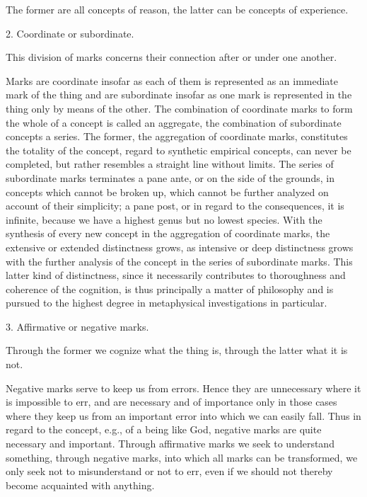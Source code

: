     The former are all concepts of reason,
    the latter can be concepts of experience.

    2. Coordinate or subordinate.

    This division of marks concerns their connection after or under one another.

    Marks are coordinate insofar as each of them is
    represented as an immediate mark of the thing
    and are subordinate insofar as one mark is
    represented in the thing only by means of the other.
    The combination of coordinate marks to form
    the whole of a concept is called an aggregate,
    the combination of subordinate concepts a series.
    The former, the aggregation of coordinate marks,
    constitutes the totality of the concept,
    regard to synthetic empirical concepts, can never be completed,
    but rather resembles a straight line without limits.
    The series of subordinate marks terminates a pane ante,
    or on the side of the grounds, in concepts which cannot be broken up,
    which cannot be further analyzed on account of their simplicity;
    a pane post, or in regard to the consequences, it is infinite,
    because we have a highest genus but no lowest species.
    With the synthesis of every new concept in the aggregation of coordinate marks,
    the extensive or extended distinctness grows,
    as intensive or deep distinctness grows with the further
    analysis of the concept in the series of subordinate marks.
    This latter kind of distinctness, since it necessarily
    contributes to thoroughness and coherence of the cognition,
    is thus principally a matter of philosophy and is pursued
    to the highest degree in metaphysical investigations in particular.

    3. Affirmative or negative marks.

    Through the former we cognize what the thing is,
    through the latter what it is not.

    Negative marks serve to keep us from errors.
    Hence they are unnecessary where it is impossible to err,
    and are necessary and of importance only in
    those cases where they keep us from an important error
    into which we can easily fall.
    Thus in regard to the concept, e.g., of a being like God,
    negative marks are quite necessary and important.
    Through affirmative marks we seek to understand something,
    through negative marks, into which all marks can be transformed,
    we only seek not to misunderstand or not to err,
    even if we should not thereby become acquainted with anything.

